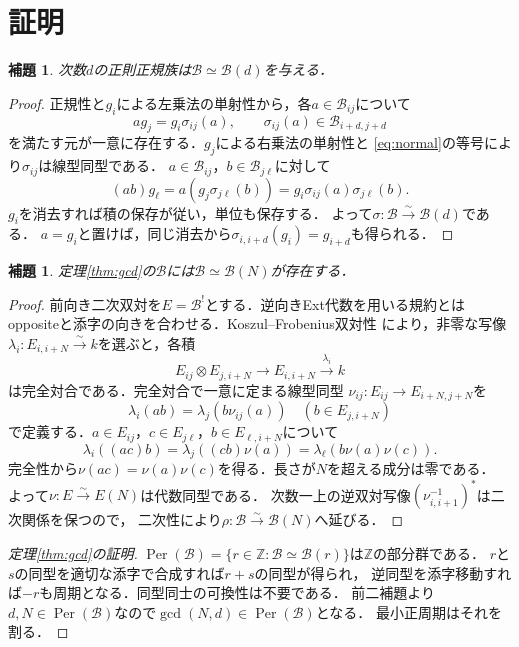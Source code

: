 \documentclass[10pt,a4paper]{ltjsarticle}
\newtheorem{lemma}[theorem]{補題}
\newcommand{\Z}{\mathbb Z}
\newcommand{\cB}{\mathcal B}
\newcommand{\Per}{\operatorname{Per}}
\begin{document}
\section{証明}
\begin{lemma}\label{lem:normal}
次数$d$の正則正規族は$\cB\simeq\cB(d)$を与える．
\end{lemma}
\begin{proof}
正規性と$g_i$による左乗法の単射性から，各$a\in\cB_{ij}$について
\[
 ag_j=g_i\sigma_{ij}(a),\qquad \sigma_{ij}(a)\in\cB_{i+d,j+d}
\]
を満たす元が一意に存在する．$g_j$による右乗法の単射性と
\eqref{eq:normal}の等号により$\sigma_{ij}$は線型同型である．
$a\in\cB_{ij}$，$b\in\cB_{j\ell}$に対して
\[
 (ab)g_\ell=a(g_j\sigma_{j\ell}(b))
 =g_i\sigma_{ij}(a)\sigma_{j\ell}(b).
\]
$g_i$を消去すれば積の保存が従い，単位も保存する．
よって$\sigma:\cB\xrightarrow{\sim}\cB(d)$である．
$a=g_i$と置けば，同じ消去から$\sigma_{i,i+d}(g_i)=g_{i+d}$も得られる．
\end{proof}

\begin{lemma}\label{lem:AS}
定理\ref{thm:gcd}の$\cB$には$\cB\simeq\cB(N)$が存在する．
\end{lemma}
\begin{proof}
前向き二次双対を$E=\cB^!$とする．逆向きExt代数を用いる規約とは
oppositeと添字の向きを合わせる．Koszul--Frobenius双対性
\cite[Proposition 4.1]{BP}により，非零な写像
$\lambda_i:E_{i,i+N}\xrightarrow{\sim}k$を選ぶと，各積
\[
 E_{ij}\otimes E_{j,i+N}\longrightarrow E_{i,i+N}
 \xrightarrow{\lambda_i}k
\]
は完全対合である．完全対合で一意に定まる線型同型
$\nu_{ij}:E_{ij}\to E_{i+N,j+N}$を
\[
 \lambda_i(ab)=\lambda_j(b\nu_{ij}(a))
 \quad (b\in E_{j,i+N})
\]
で定義する．$a\in E_{ij}$，$c\in E_{j\ell}$，$b\in E_{\ell,i+N}$について
\[
 \lambda_i((ac)b)=\lambda_j((cb)\nu(a))
 =\lambda_\ell(b\nu(a)\nu(c)).
\]
完全性から$\nu(ac)=\nu(a)\nu(c)$を得る．長さが$N$を超える成分は零である．
よって$\nu:E\xrightarrow{\sim}E(N)$は代数同型である．
次数一上の逆双対写像$(\nu_{i,i+1}^{-1})^*$は二次関係を保つので，
二次性により$\rho:\cB\xrightarrow{\sim}\cB(N)$へ延びる．
\end{proof}

\begin{proof}[定理\ref{thm:gcd}の証明]
$\Per(\cB)=\{r\in\Z:\cB\simeq\cB(r)\}$は$\Z$の部分群である．
$r$と$s$の同型を適切な添字で合成すれば$r+s$の同型が得られ，
逆同型を添字移動すれば$-r$も周期となる．同型同士の可換性は不要である．
前二補題より$d,N\in\Per(\cB)$なので$\gcd(N,d)\in\Per(\cB)$となる．
最小正周期はそれを割る．
\end{proof}
\end{document}
